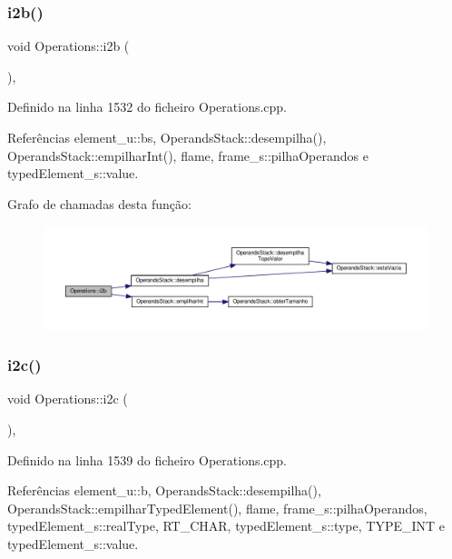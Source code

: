 \subsubsection{\texorpdfstring{i2b()}{i2b()}}
{\footnotesize\ttfamily void Operations\+::i2b (\begin{DoxyParamCaption}{ }\end{DoxyParamCaption})\hspace{0.3cm}{\ttfamily [static]}, {\ttfamily [private]}}



Definido na linha 1532 do ficheiro Operations.\+cpp.



Referências element\+\_\+u\+::bs, Operands\+Stack\+::desempilha(), Operands\+Stack\+::empilhar\+Int(), flame, frame\+\_\+s\+::pilha\+Operandos e typed\+Element\+\_\+s\+::value.

Grafo de chamadas desta função\+:
\nopagebreak
\begin{figure}[H]
\begin{center}
\leavevmode
\includegraphics[width=350pt]{classOperations_adfe0344bae5a1252330b7324e827ed35_cgraph}
\end{center}
\end{figure}
\mbox{\label{classOperations_a43b01132bf9acf598d0ced8719c194c7}} 
\subsubsection{\texorpdfstring{i2c()}{i2c()}}
{\footnotesize\ttfamily void Operations\+::i2c (\begin{DoxyParamCaption}{ }\end{DoxyParamCaption})\hspace{0.3cm}{\ttfamily [static]}, {\ttfamily [private]}}



Definido na linha 1539 do ficheiro Operations.\+cpp.



Referências element\+\_\+u\+::b, Operands\+Stack\+::desempilha(), Operands\+Stack\+::empilhar\+Typed\+Element(), flame, frame\+\_\+s\+::pilha\+Operandos, typed\+Element\+\_\+s\+::real\+Type, R\+T\+\_\+\+C\+H\+AR, typed\+Element\+\_\+s\+::type, T\+Y\+P\+E\+\_\+\+I\+NT e typed\+Element\+\_\+s\+::value.

